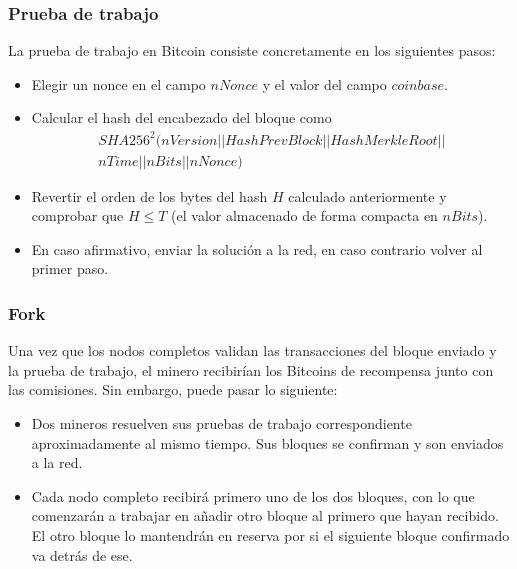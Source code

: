 \documentclass{beamer}
\theoremstyle{definition}
\begin{document}
\begin{frame}
	\frametitle{Prueba de trabajo}
	La prueba de trabajo en Bitcoin consiste concretamente en los siguientes pasos:
	\begin{itemize}
		\item<2-> Elegir un nonce en el campo $nNonce$ y el valor del campo $coinbase$.
		\item<3-> Calcular el hash del encabezado del bloque como
		\begin{gather*}
		SHA256^2(nVersion||HashPrevBlock||HashMerkleRoot||\\ nTime||nBits||nNonce)
		\end{gather*}
		
		\item<4-> Revertir el orden de los bytes del hash $H$ calculado anteriormente y comprobar que $H\leq T$ (el valor almacenado de forma compacta en $nBits$).
		\item<5-> En caso afirmativo, enviar la solución a la red, en caso contrario volver al primer paso.
	\end{itemize}
\end{frame}

\begin{frame}
	\frametitle{Fork}
	Una vez que los nodos completos validan las transacciones del bloque enviado y la prueba de trabajo, el minero recibirían los Bitcoins de recompensa junto con las comisiones. Sin embargo, puede pasar lo siguiente:
	
	\begin{itemize}
		\item<2-> Dos mineros resuelven sus pruebas de trabajo correspondiente aproximadamente al mismo tiempo. Sus bloques se confirman y son enviados a la red.
		\item<3-> Cada nodo completo recibirá primero uno de los dos bloques, con lo que comenzarán a trabajar en añadir otro bloque al primero que hayan recibido. El otro bloque lo mantendrán en reserva por si el siguiente bloque confirmado va detrás de ese.
	\end{itemize}
\end{frame}
\end{document}
